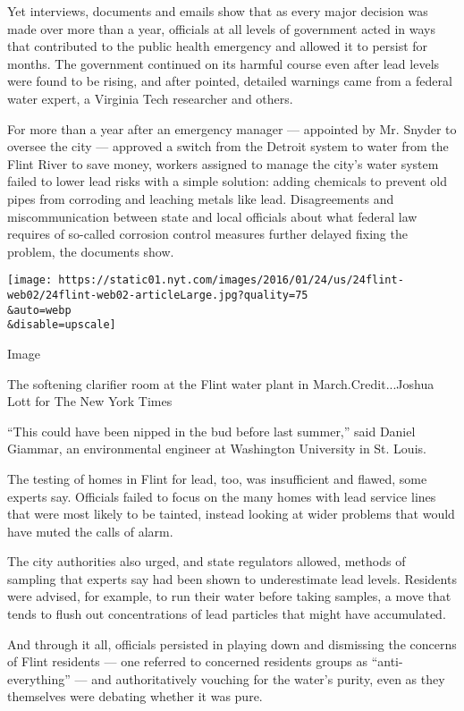 Yet interviews, documents and emails show that as every major decision
was made over more than a year, officials at all levels of government
acted in ways that contributed to the public health emergency and
allowed it to persist for months. The government continued on its
harmful course even after lead levels were found to be rising, and after
pointed, detailed warnings came from a federal water expert, a Virginia
Tech researcher and others.

For more than a year after an emergency manager --- appointed by Mr.
Snyder to oversee the city --- approved a switch from the Detroit system
to water from the Flint River to save money, workers assigned to manage
the city's water system failed to lower lead risks with a simple
solution: adding chemicals to prevent old pipes from corroding and
leaching metals like lead. Disagreements and miscommunication between
state and local officials about what federal law requires of so-called
corrosion control measures further delayed fixing the problem, the
documents show.

\texttt{[image: https://static01.nyt.com/images/2016/01/24/us/24flint-web02/24flint-web02-articleLarge.jpg?quality=75\\\&auto=webp\\\&disable=upscale]}

Image

The softening clarifier room at the Flint water plant in
March.Credit...Joshua Lott for The New York Times

``This could have been nipped in the bud before last summer,'' said
Daniel Giammar, an environmental engineer at Washington University in
St. Louis.

The testing of homes in Flint for lead, too, was insufficient and
flawed, some experts say. Officials failed to focus on the many homes
with lead service lines that were most likely to be tainted, instead
looking at wider problems that would have muted the calls of alarm.

The city authorities also urged, and state regulators allowed, methods
of sampling that experts say had been shown to underestimate lead
levels. Residents were advised, for example, to run their water before
taking samples, a move that tends to flush out concentrations of lead
particles that might have accumulated.

And through it all, officials persisted in playing down and dismissing
the concerns of Flint residents --- one referred to concerned residents
groups as ``anti-everything'' --- and authoritatively vouching for the
water's purity, even as they themselves were debating whether it was
pure.

